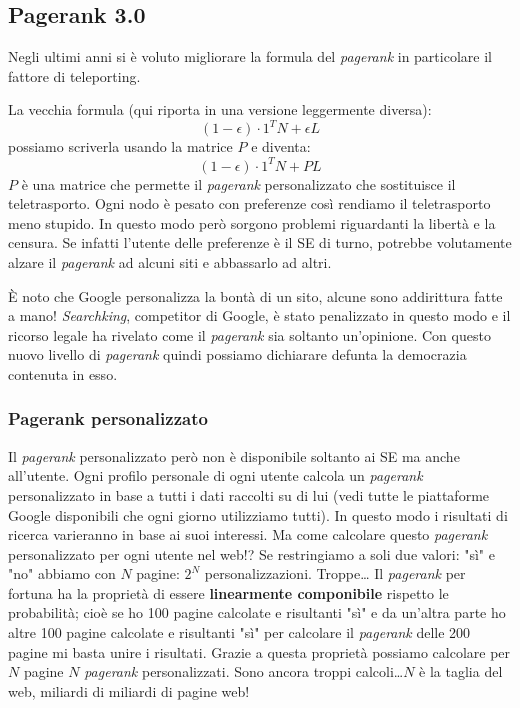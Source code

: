 		\subsection{Pagerank 3.0}
			Negli ultimi anni si è voluto migliorare la formula del \emph{pagerank} in particolare il fattore di teleporting.
			
			La vecchia formula (qui riporta in una versione leggermente diversa):
			\[
				(1-\epsilon )\cdot 1^T N + \epsilon L
			\]
			possiamo scriverla usando la matrice $P$ e diventa:
			\[
				(1- \epsilon )\cdot 1^T N + PL
			\]
			$P$ è una matrice che permette il \emph{pagerank} personalizzato che sostituisce il teletrasporto. Ogni nodo è pesato con preferenze così rendiamo il teletrasporto meno stupido. In questo modo però sorgono problemi riguardanti la libertà e la censura. Se infatti l'utente delle preferenze è il SE di turno, potrebbe volutamente alzare il \emph{pagerank} ad alcuni siti e abbassarlo ad altri. 
			
			È noto che Google personalizza la bontà di un sito, alcune sono addirittura fatte a mano! \emph{Searchking}, competitor di Google, è stato penalizzato in questo modo e il ricorso legale ha rivelato come il \emph{pagerank} sia soltanto un'opinione.
			Con questo nuovo livello di \emph{pagerank} quindi possiamo dichiarare defunta la democrazia contenuta in esso.
		
			\subsubsection{Pagerank personalizzato}
			
				Il \emph{pagerank} personalizzato però non è disponibile soltanto ai SE ma anche all'utente. Ogni profilo personale di ogni utente calcola un \emph{pagerank} personalizzato in base a tutti i dati raccolti su di lui (vedi tutte le piattaforme Google disponibili che ogni giorno utilizziamo tutti).  In questo modo i risultati di ricerca varieranno in base ai suoi interessi.
				Ma come calcolare questo \emph{pagerank} personalizzato per ogni utente nel web!? Se restringiamo a soli due valori: "sì" e "no" abbiamo con $N$ pagine: $2^N$ personalizzazioni. Troppe\dots
				Il \emph{pagerank} per fortuna ha la proprietà di essere \textbf{linearmente componibile} rispetto le probabilità; cioè se ho 100 pagine calcolate e risultanti "sì" e da un'altra parte ho altre 100 pagine calcolate e risultanti "sì" per calcolare il  \emph{pagerank} delle 200 pagine mi basta unire i risultati. Grazie a questa proprietà possiamo calcolare per $N$ pagine $N$ \emph{pagerank} personalizzati. Sono ancora troppi calcoli\dots $N$ è la taglia del web, miliardi di miliardi di pagine web!
				
